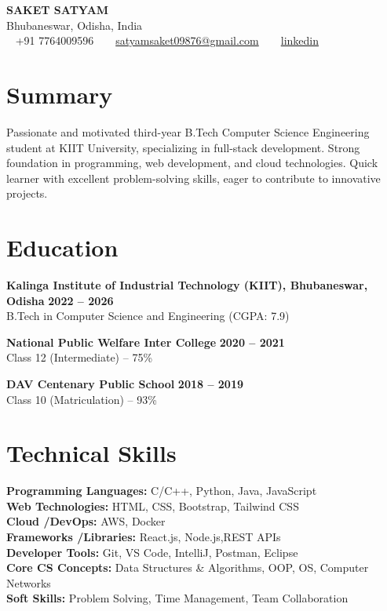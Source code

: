 \documentclass[a4paper,10pt]{article}
\newcommand{\namefont}{\fontsize{22}{24}\selectfont}
\newcommand{\locationfont}{\fontsize{12}{14}\selectfont}
\begin{document}
\begin{center}
    {\namefont \textbf{SAKET SATYAM}} \\ 
    {\locationfont Bhubaneswar, Odisha, India} \\ 
    \vspace{2pt}
    \faPhone~ +91 7764009596 \textbullet~
    \faEnvelope~ \href{mailto:satyamsaket09876@gmail.com}{satyamsaket09876@gmail.com} \textbullet~
    \faLinkedin~ \href{https://www.linkedin.com/in/saket-satyam}{linkedin}
\end{center}

\section*{Summary}
Passionate and motivated third-year B.Tech Computer Science Engineering student at KIIT University, specializing in full-stack development. Strong foundation in programming, web development, and cloud technologies. Quick learner with excellent problem-solving skills, eager to contribute to innovative projects.

\section*{Education}
\textbf{Kalinga Institute of Industrial Technology (KIIT), Bhubaneswar, Odisha} \hfill \textbf{2022 -- 2026} \\
B.Tech in Computer Science and Engineering (CGPA: 7.9)

\textbf{National Public Welfare Inter College} \hfill \textbf{2020 -- 2021} \\
Class 12 (Intermediate) -- 75\%

\textbf{DAV Centenary Public School} \hfill \textbf{2018 -- 2019} \\
Class 10 (Matriculation) -- 93\%

\section*{Technical Skills}
\textbf{Programming Languages:} C/C++, Python, Java, JavaScript \\
\textbf{Web Technologies:} HTML, CSS, Bootstrap, Tailwind CSS \\
\textbf{Cloud \slash DevOps:} AWS, Docker \\
\textbf{Frameworks \slash Libraries:} React.js, Node.js,REST APIs \\
\textbf{Developer Tools:} Git, VS Code, IntelliJ, Postman, Eclipse \\
\textbf{Core CS Concepts:} Data Structures \& Algorithms, OOP, OS, Computer Networks \\
\textbf{Soft Skills:} Problem Solving, Time Management, Team Collaboration
\end{document}
